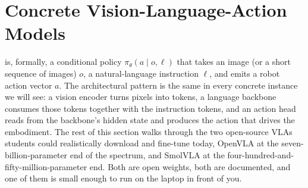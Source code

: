 %
%



\section{Concrete Vision-Language-Action Models}


 is, formally, a conditional policy $\pi_\theta(a \mid o, \ell)$ that takes an image (or a short sequence of images) $o$, a natural-language instruction $\ell$, and emits a robot action vector $a$. The architectural pattern is the same in every concrete instance we will see: a vision encoder turns pixels into tokens, a language backbone consumes those tokens together with the instruction tokens, and an action head reads from the backbone's hidden state and produces the action that drives the embodiment. The rest of this section walks through the two open-source VLAs students could realistically download and fine-tune today, OpenVLA at the seven-billion-parameter end of the spectrum, and SmolVLA at the four-hundred-and-fifty-million-parameter end. Both are open weights, both are documented, and one of them is small enough to run on the laptop in front of you.

